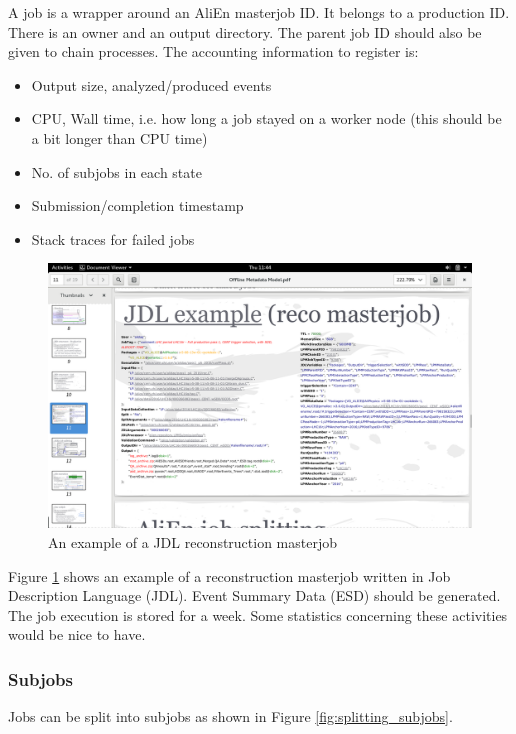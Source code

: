 A job is a wrapper around an AliEn masterjob ID. It belongs to a production ID. There is an owner and an output directory. The parent job ID should also be given to chain processes. The accounting information to register is:
\begin{itemize}
  \item Output size, analyzed/produced events
  \item CPU, Wall time, i.e. how long a job stayed on a worker node (this should be a bit longer than CPU time)
  \item No. of subjobs in each state
  \item Submission/completion timestamp
  \item Stack traces for failed jobs
\end{itemize}


\begin{figure}[h]
  \begin{center}
    \includegraphics[scale=0.15]{./images/jdl_example.png}
    \caption{An example of a JDL reconstruction masterjob}
    \label{fig:jdl_example}
  \end{center}
\end{figure}
Figure \ref{fig:jdl_example} shows an example of a reconstruction masterjob written in Job Description Language (JDL). Event Summary Data (ESD) should be generated. The job execution is stored for a week. Some statistics concerning these activities would be nice to have.

\subsubsection{Subjobs}
Jobs can be split into subjobs as shown in Figure \ref{fig:splitting_subjobs}.

